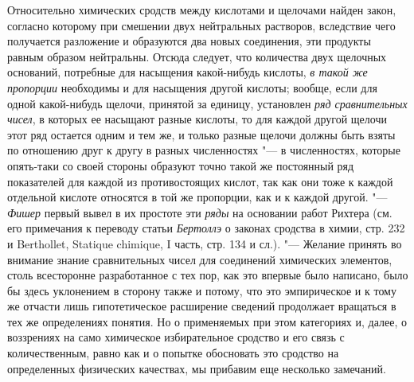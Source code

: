 Относительно химических сродств между кислотами и щелочами найден закон,
согласно которому при смешении двух нейтральных растворов, вследствие чего
получается разложение и образуются два новых соединения, эти продукты
равным образом нейтральны. Отсюда следует, что количества двух щелочных
оснований, потребные для насыщения какой-нибудь кислоты,
{\em в такой же пропорции} необходимы и для насыщения
другой кислоты; вообще, если для одной какой-нибудь щелочи, принятой за
единицу, установлен {\em ряд сравнительных чисел}, в
которых ее насыщают разные кислоты, то для каждой другой щелочи этот ряд
остается одним и тем же, и только разные щелочи должны быть взяты по
отношению друг к другу в разных численностях "--- в численностях, которые
опять-таки со своей стороны образуют точно такой же постоянный ряд
показателей для каждой из противостоящих кислот, так как они тоже к каждой
отдельной кислоте относятся в той же пропорции, как и к каждой другой. "---
{\em Фишер} первый вывел в их простоте эти
{\em ряды} на основании работ Рихтера (см. его
примечания к переводу статьи {\em Бертоллэ} о законах
сродства в химии, стр. 232 и Berthollet, Statique chimique, I часть, стр.
134 и сл.). "--- Желание принять во внимание знание сравнительных чисел для
соединений химических элементов, столь всесторонне разработанное с тех пор,
как это впервые было написано, было бы здесь уклонением в сторону также и
потому, что это эмпирическое и к тому же отчасти лишь гипотетическое
расширение сведений продолжает вращаться в тех же определениях понятия. Но
о применяемых при этом категориях и, далее, о воззрениях на само химическое
избирательное сродство и его связь с количественным, равно как и о попытке
обосновать это сродство на определенных физических качествах, мы прибавим
еще несколько замечаний.

